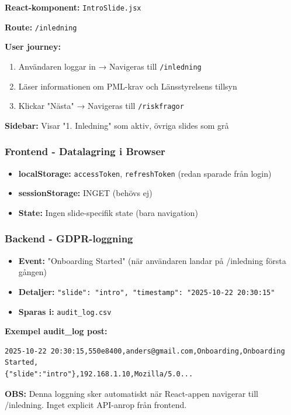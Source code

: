 \documentclass[12pt,a4paper]{article}
\begin{document}
\textbf{React-komponent:} \texttt{IntroSlide.jsx}

\textbf{Route:} \texttt{/inledning}

\textbf{User journey:}
\begin{enumerate}[noitemsep]
  \item Användaren loggar in → Navigeras till \texttt{/inledning}
  \item Läser informationen om PML-krav och Länsstyrelsens tillsyn
  \item Klickar "Nästa" → Navigeras till \texttt{/riskfragor}
\end{enumerate}

\textbf{Sidebar:} Visar "1. Inledning" som aktiv, övriga slides som grå

\subsubsection{Frontend - Datalagring i Browser}
\begin{itemize}[noitemsep]
  \item \textbf{localStorage:} \texttt{accessToken}, \texttt{refreshToken} (redan sparade från login)
  \item \textbf{sessionStorage:} INGET (behövs ej)
  \item \textbf{State:} Ingen slide-specifik state (bara navigation)
\end{itemize}

\subsubsection{Backend - GDPR-loggning}
\begin{itemize}[noitemsep]
  \item \textbf{Event:} "Onboarding Started" (när användaren landar på /inledning första gången)
  \item \textbf{Detaljer:} \texttt{"slide": "intro", "timestamp": "2025-10-22 20:30:15"}
  \item \textbf{Sparas i:} \texttt{audit\_log.csv}
\end{itemize}

\textbf{Exempel audit\_log post:}
\begin{lstlisting}
2025-10-22 20:30:15,550e8400,anders@gmail.com,Onboarding,Onboarding Started,
{"slide":"intro"},192.168.1.10,Mozilla/5.0...
\end{lstlisting}

\textbf{OBS:} Denna loggning sker automatiskt när React-appen navigerar till /inledning. Inget explicit API-anrop från frontend.
\end{document}
